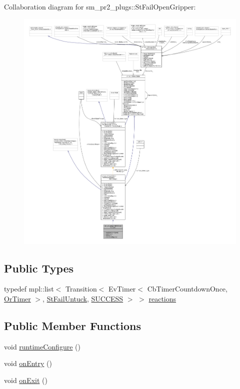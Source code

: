 Collaboration diagram for sm\+\_\+pr2\+\_\+plugs\+:\+:St\+Fail\+Open\+Gripper\+:
\nopagebreak
\begin{figure}[H]
\begin{center}
\leavevmode
\includegraphics[width=350pt]{structsm__pr2__plugs_1_1StFailOpenGripper__coll__graph}
\end{center}
\end{figure}
\subsection*{Public Types}
\begin{DoxyCompactItemize}
\item 
typedef mpl\+::list$<$ Transition$<$ Ev\+Timer$<$ Cb\+Timer\+Countdown\+Once, \hyperlink{classsm__pr2__plugs_1_1OrTimer}{Or\+Timer} $>$, \hyperlink{structsm__pr2__plugs_1_1StFailUntuck}{St\+Fail\+Untuck}, \hyperlink{classSUCCESS}{S\+U\+C\+C\+E\+SS} $>$ $>$ \hyperlink{structsm__pr2__plugs_1_1StFailOpenGripper_a64622a0c63bb5c86b60552ba92437e91}{reactions}
\end{DoxyCompactItemize}
\subsection*{Public Member Functions}
\begin{DoxyCompactItemize}
\item 
void \hyperlink{structsm__pr2__plugs_1_1StFailOpenGripper_a9972024358d52891ff6ff0282f1abfba}{runtime\+Configure} ()
\item 
void \hyperlink{structsm__pr2__plugs_1_1StFailOpenGripper_a45edfde0fd2cc5356d7574e82ef234f2}{on\+Entry} ()
\item 
void \hyperlink{structsm__pr2__plugs_1_1StFailOpenGripper_a8c58e8284c654235294a9032dd4a3d22}{on\+Exit} ()
\end{DoxyCompactItemize}
